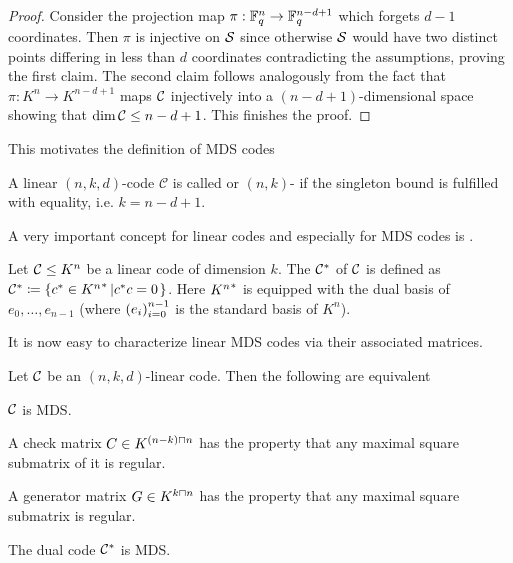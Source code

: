 \begin{proof}
    Consider the projection map $\pi:\mathbb{F}_{q}^n\rightarrow\mathbb{F}_{q}^{n-d+1}$ which forgets $d-1$ coordinates.
    Then $\pi$ is injective on $\mathcal{S}$ since otherwise $\mathcal{S}$ would have two distinct points differing in less than $d$ coordinates contradicting the assumptions, proving the first claim.
    The second claim follows analogously from the fact that $\pi:K^n\to K^{n-d+1}$ maps $\mathcal{C}$ injectively into a $(n-d+1)$-dimensional space showing that $\dim{\mathcal{C}}\leq n-d+1$.
    This finishes the proof.
\end{proof}

This motivates the definition of MDS codes

\begin{definition}
    A linear $(n,k,d)$-code $\mathcal{C}$ is called  or $(n,k)$- if the singleton bound is fulfilled with equality, i.e. $k=n-d+1$. 
\end{definition}

A very important concept for linear codes and especially for MDS codes is .

\begin{definition}\label{lincode-dual}
    Let $\mathcal{C}\leq K^n$ be a linear code of dimension $k$. The  ${\mathcal{C}}^{\ast}$ of $\mathcal{C}$ is defined as $\dual\cC\defeq\set{c^{\ast}\in \dual{K^n}}[c^{\ast}c=0]$. Here ${K^n}^{\ast}$ is equipped with the dual basis of $e_0,\ldots,e_{n-1}$ (where $\seq{e_i}_{i=0}^{n-1}$ is the standard basis of $K^n$).
\end{definition}

It is now easy to characterize linear MDS codes via their associated matrices.

\begin{lemma}\label{mdschar}
    Let $\mathcal{C}$ be an $(n,k,d)$-linear code. Then the following are equivalent
    \begin{statements}
            \item\label{mds} $\mathcal{C}$ is MDS.
            \item\label{mds-chkmtrx} A check matrix $C \in K^{(n-k)\setprod n}$ has the property that any maximal square submatrix of it is regular.
            \item\label{mds-gmtrx} A generator matrix $G \in K^{k\setprod n}$ has the property that any maximal square submatrix is regular.
            \item\label{mds-dual} The dual code ${\mathcal{C}}^{\ast}$ is MDS.
    \end{statements}
\end{lemma}

